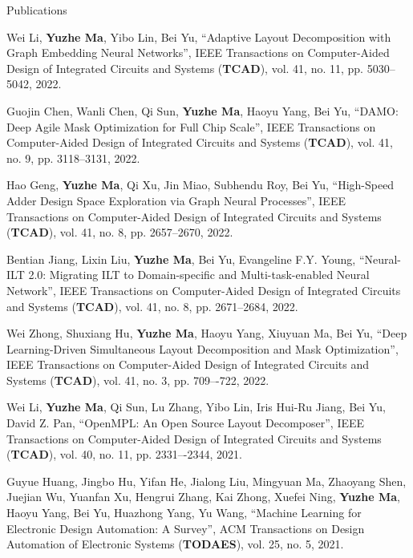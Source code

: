 \begin{rSection}{Publications}
\begin{description}[font=\normalfont]
\item[{[J16]}] {
    Wei Li, \textbf{Yuzhe Ma}, Yibo Lin, Bei Yu,
    ``Adaptive Layout Decomposition with Graph Embedding Neural Networks'',
    IEEE Transactions on Computer-Aided Design of Integrated Circuits and Systems (\textbf{TCAD}), vol. 41, no. 11, pp. 5030--5042, 2022.
}

\item[{[J15]}] {
    Guojin Chen, Wanli Chen, Qi Sun, \textbf{Yuzhe Ma}, Haoyu Yang, Bei Yu,
    ``DAMO: Deep Agile Mask Optimization for Full Chip Scale'',
    IEEE Transactions on Computer-Aided Design of Integrated Circuits and Systems (\textbf{TCAD}), vol. 41, no. 9, pp. 3118--3131, 2022. 
}


\item[{[J14]}] {
    Hao Geng, \textbf{Yuzhe Ma}, Qi Xu, Jin Miao, Subhendu Roy, Bei Yu,
    ``High-Speed Adder Design Space Exploration via Graph Neural Processes'',
    IEEE Transactions on Computer-Aided Design of Integrated Circuits and Systems (\textbf{TCAD}), vol. 41, no. 8, pp. 2657--2670, 2022.
}


\item[{[J13]}] {
    Bentian Jiang, Lixin Liu, \textbf{Yuzhe Ma}, Bei Yu, Evangeline F.Y. Young,
    ``Neural-ILT 2.0: Migrating ILT to Domain-specific and Multi-task-enabled Neural Network'',
    IEEE Transactions on Computer-Aided Design of Integrated Circuits and Systems (\textbf{TCAD}), vol. 41, no. 8, pp. 2671--2684, 2022.
}

\item[{[J12]}] {
    Wei Zhong, Shuxiang Hu, \textbf{Yuzhe Ma}, Haoyu Yang, Xiuyuan Ma, Bei Yu,
    ``Deep Learning-Driven Simultaneous Layout Decomposition and Mask Optimization'',
    IEEE Transactions on Computer-Aided Design of Integrated Circuits and Systems (\textbf{TCAD}),  vol. 41, no. 3, pp. 709–-722, 2022. 
}

\item[{[J11]}]{
    Wei Li, \textbf{Yuzhe Ma}, Qi Sun, Lu Zhang, Yibo Lin, Iris Hui-Ru Jiang, Bei Yu, David Z. Pan,
    ``OpenMPL: An Open Source Layout Decomposer'',
    IEEE Transactions on Computer-Aided Design of Integrated Circuits and Systems (\textbf{TCAD}), vol. 40, no. 11, pp. 2331–-2344, 2021.
}

\item[{[J10]}] {
        Guyue Huang, Jingbo Hu, Yifan He, Jialong Liu, Mingyuan Ma, Zhaoyang Shen, Juejian Wu, Yuanfan Xu, Hengrui Zhang, Kai Zhong, Xuefei Ning, \textbf{Yuzhe Ma}, Haoyu Yang, Bei Yu, Huazhong Yang, Yu Wang,
        ``Machine Learning for Electronic Design Automation: A Survey'',
        ACM Transactions on Design Automation of Electronic Systems (\textbf{TODAES}), vol. 25, no. 5, 2021.
}


\end{description}
\end{rSection}
